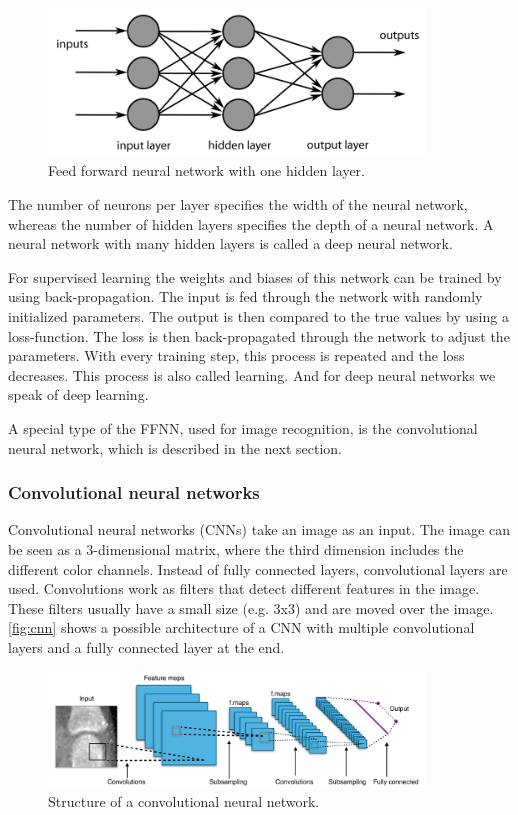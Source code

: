 \documentclass[12pt]{article}
\begin{document}
\begin{figure}[ht]
\includegraphics[width=10cm]{ffnn}	
\caption{Feed forward neural network with one hidden layer.}
\label{fig:fcnn}
\end{figure}

The number of neurons per layer specifies the width of the neural network, whereas the number of hidden layers specifies the depth of a neural network. A neural network with many hidden layers is called a deep neural network.

For supervised learning the weights and biases of this network can be trained by using back-propagation. The input is fed through the network with randomly initialized parameters. The output is then compared to the true values by using a loss-function. The loss is then back-propagated through the network to adjust the parameters. With every training step, this process is repeated and the loss decreases. This process is also called learning. And for deep neural networks we speak of deep learning.

A special type of the FFNN, used for image recognition, is the convolutional neural network, which is described in the next section.

\subsubsection{Convolutional neural networks}
\label{subsubsec:cnn}
Convolutional neural networks (CNNs) take an image as an input. The image can be seen as a 3-dimensional matrix, where the third dimension includes the different color channels. Instead of fully connected layers, convolutional layers are used. Convolutions work as filters that detect different features in the image. These filters usually have a small size (e.g. 3x3) and are moved over the image. \autoref{fig:cnn} shows a possible architecture of a CNN with multiple convolutional layers and a fully connected layer at the end.

\begin{figure}[ht]
\includegraphics[width=10cm]{cnn}	
\caption{Structure of a convolutional neural network.}
\label{fig:cnn}
\end{figure}
\end{document}
